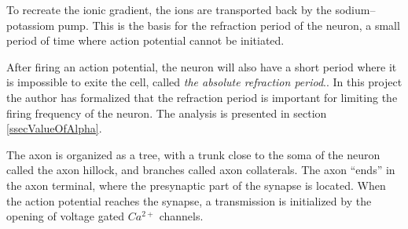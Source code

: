 To recreate the ionic gradient, the ions are transported back by the sodium--potassiom pump.
This is the basis for the refraction period of the neuron, a small period of time where action potential cannot be initiated\cite{NeuroscienceExploringTheBrain3edKAP4}.

After firing an action potential, the neuron will also have a short period where it is impossible to exite the cell, called \emph{the absolute refraction period}\cite{PrinciplesOfNeuralScience4edKAP09}.. 
In this project the author has formalized that the refraction period is important for limiting the firing frequency of the neuron. The analysis is presented in section \ref{ssecValueOfAlpha}.

The axon is organized as a tree, with a trunk close to the soma of the neuron called the axon hillock, and branches called axon collaterals. 
The axon ``ends'' in the axon terminal, where the presynaptic part of the synapse is located.
When the action potential reaches the synapse, a transmission is initialized by the opening of voltage gated $Ca^{2+}$ channels\cite{PrinciplesOfNeuralScience4edKAP10}.








